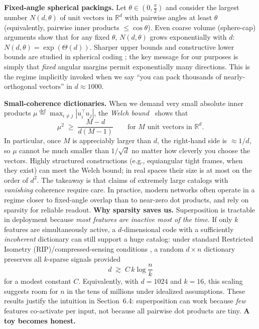 \textbf{Fixed-angle spherical packings.}
Let $\theta \in (0,\tfrac{\pi}{2})$ and consider the largest number $N(d,\theta)$ of unit vectors in $\mathbb{R}^d$ with pairwise angles at least $\theta$ (equivalently, pairwise inner products $\le \cos\theta$).
Even coarse volume (sphere-cap) arguments show that for any fixed $\theta$, $N(d,\theta)$ grows exponentially with $d$: $N(d,\theta)=\exp(\Theta(d))$. Sharper upper bounds and constructive lower bounds are studied in spherical coding \citep{kabatiansky1978,delsarte1977}; the key message for our purposes is simply that \emph{fixed} angular margins permit exponentially many directions. This is the regime implicitly invoked when we say ``you can pack thousands of nearly-orthogonal vectors'' in $d\approx 1000$.

\textbf{Small-coherence dictionaries.}
When we demand very small absolute inner products $\mu \stackrel{\mathrm{def}}{=} \max_{i\neq j} |u_i^\top u_j|$, the \emph{Welch bound}~\citep{welch1974} shows that
\[
  \mu^2 \;\ge\; \frac{M-d}{d(M-1)} \qquad \text{for $M$ unit vectors in $\mathbb{R}^d$.}
\]
In particular, once $M$ is appreciably larger than $d$, the right-hand side is $\approx 1/d$, so $\mu$ cannot be much smaller than $1/\sqrt{d}$ no matter how cleverly you choose the vectors. Highly structured constructions (e.g., equiangular tight frames, when they exist) can meet the Welch bound; in real spaces their size is at most on the order of $d^2$. The takeaway is that claims of extremely large catalogs with \emph{vanishing} coherence require care. In practice, modern networks often operate in a regime closer to fixed-angle overlap than to near-zero dot products, and rely on sparsity for reliable readout.
\textbf{Why sparsity saves us.}
Superposition is tractable in deployment because \emph{most features are inactive most of the time}. If only $k$ features are simultaneously active, a $d$-dimensional code with a sufficiently \emph{incoherent} dictionary can still support a huge catalog: under standard Restricted Isometry (RIP)/compressed-sensing conditions \citep{candes2006,donoho2006,baraniuk2007}, a random $d\times n$ dictionary preserves all $k$-sparse signals provided
\[
  d \;\gtrsim\; C\, k \log\!\frac{n}{k}
\]
for a modest constant $C$. Equivalently, with $d=1024$ and $k=16$, this scaling suggests room for $n$ in the tens of millions under idealized assumptions. These results justify the intuition in Section~6.4: superposition can work because \emph{few} features co-activate per input, not because all pairwise dot products are tiny.
\textbf{A toy becomes honest.}
